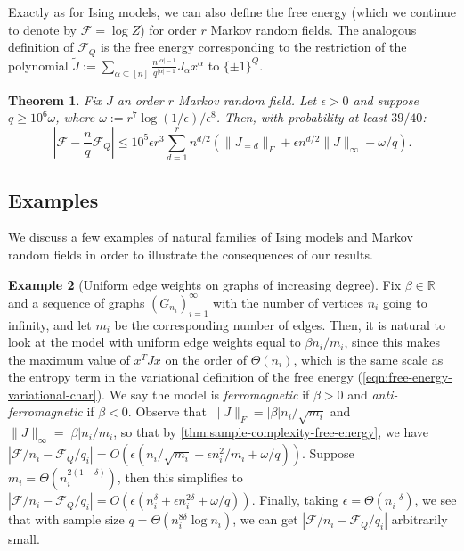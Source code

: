 \documentclass[final, 12pt]{colt2018}
\newcommand{\F}{\mathcal{F}}
\newtheorem{theorem}{Theorem}[section]
\theoremstyle{definition}
\newtheorem{example}[theorem]{Example}
\theoremstyle{plain}
\begin{document}
Exactly as for Ising models, we can also define the free energy (which we continue to denote by $\F = \log Z$) for order $r$ Markov random fields. The analogous definition of $\F_Q$ is the free energy corresponding to the restriction of the polynomial $\tilde{J} := \sum_{\alpha \subseteq [n]}\frac{n^{|\alpha|-1}}{q^{|\alpha|-1}}J_\alpha x^\alpha $ to $\{\pm 1\}^Q$.

\begin{theorem}
\label{thm-mrf-sample-complexity}
Fix $J$ an order $r$ Markov random field.
Let $\epsilon > 0$ and suppose $q \ge 10^6\omega$, where $\omega:= r^7\log(1/\epsilon)/\epsilon^{8}$. 
Then, with probability at least $39/40$:
$$\left|\F - \frac{n}{q}\F_Q\right| \leq 10^5\epsilon r^3 \sum_{d = 1}^r n^{d/2} \left(\|J_{=d}\|_F + \epsilon n^{d/2} \|J\|_{\infty} + \omega/q\right).$$
\end{theorem}

\subsection{Examples}
We discuss a few examples of natural families of Ising models and Markov random fields in order to illustrate the consequences of our results.

\begin{example}[Uniform edge weights on graphs of increasing degree]\label{example:uniform-edge-weights}
Fix $\beta \in \mathbb{R}$ and a sequence of graphs
$(G_{n_i})_{i = 1}^{\infty}$ with the number of vertices $n_i$ going to infinity, and let $m_i$ be the corresponding number of edges. Then, it is natural to look at the model
with uniform edge weights equal to $\beta n_i/m_i$, since this makes
the maximum value of $x^T J x$ on the order of $\Theta(n_i)$, which is 
the same scale as the entropy term in the variational definition of the free energy (\cref{eqn:free-energy-variational-char}). We say the model is \emph{ferromagnetic} if $\beta > 0$ and \emph{anti-ferromagnetic} if $\beta < 0$. Observe that $\|J\|_F = |\beta| n_i/\sqrt{m_i}$ and $\|J\|_{\infty} = |\beta|n_i/m_i$, so that by \cref{thm:sample-complexity-free-energy}, we have $|\mathcal{F}/n_i - \mathcal{F}_Q/q_i| = O(\epsilon (n_i/\sqrt{m_i} + \epsilon n_i^2/m_i + \omega/q))$. Suppose
$m_i = \Theta(n_i^{2(1 - \delta)})$, then this simplifies to
$|\mathcal{F}/n_i - \mathcal{F}_Q/q_i| = O(\epsilon (n_i^{\delta} + \epsilon n_i^{2\delta} + \omega/q))$. Finally, taking $\epsilon = \Theta(n_i^{-\delta})$, we see that with sample size $q = \Theta(n_i^{8 \delta} \log n_i)$, we can get $|\mathcal{F}/n_i - \mathcal{F}_Q/q_i|$ arbitrarily small.
\end{example}
\end{document}
